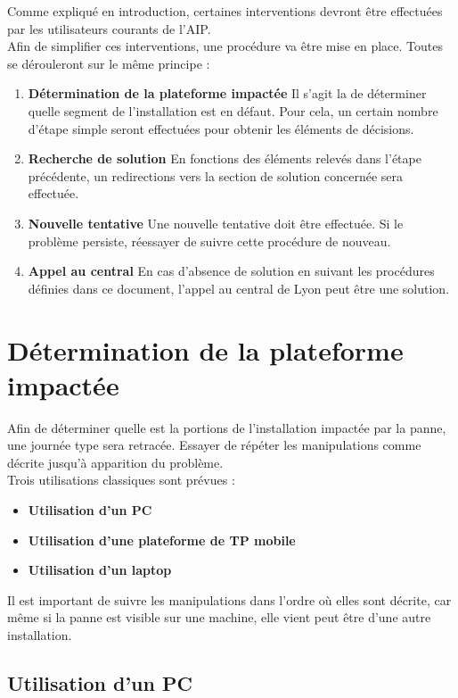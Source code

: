 \documentclass[a4paper]{article}
\begin{document}
Comme expliqué en introduction, certaines interventions devront être effectuées par les utilisateurs courants de l'AIP.\\
Afin de simplifier ces interventions, une procédure va être mise en place. Toutes se dérouleront sur le même principe : 
\begin{enumerate}
	\item \textbf{Détermination de la plateforme impactée} Il s'agit la de déterminer quelle segment de l'installation est en défaut. Pour cela, un certain nombre d'étape simple seront effectuées pour obtenir les éléments de décisions.
	\item \textbf{Recherche de solution} En fonctions des éléments relevés dans l'étape précédente, un redirections vers la section de solution concernée sera effectuée.
	\item \textbf{Nouvelle tentative} Une nouvelle tentative doit être effectuée. Si le problème persiste, réessayer de suivre cette procédure de nouveau.
	\item \textbf{Appel au central} En cas d'absence de solution en suivant les procédures définies dans ce document, l'appel au central de Lyon peut être une solution.
\end{enumerate}

\section{Détermination de la plateforme impactée}
Afin de déterminer quelle est la portions de l'installation impactée par la panne, une journée type sera retracée. Essayer de répéter les manipulations comme décrite jusqu'à apparition du problème.\\
Trois utilisations classiques sont prévues : 
\begin{itemize}
	\item \textbf{Utilisation d'un PC}
	\item \textbf{Utilisation d'une plateforme de TP mobile}
	\item \textbf{Utilisation d'un laptop}
\end{itemize}

Il est important de suivre les manipulations dans l'ordre où elles sont décrite, car même si la panne est visible sur une machine, elle vient peut être d'une autre installation.


\subsection{Utilisation d'un PC}
\end{document}
